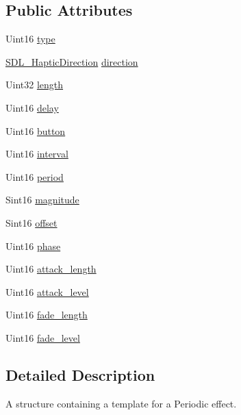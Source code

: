 \subsection*{Public Attributes}
\begin{DoxyCompactItemize}
\item 
Uint16 \hyperlink{structSDL__HapticPeriodic_ac53c5725e8cff012e9b90e01b7110869}{type}
\item 
\hyperlink{structSDL__HapticDirection}{S\+D\+L\+\_\+\+Haptic\+Direction} \hyperlink{structSDL__HapticPeriodic_a2c4f27d4583187a7a994e79ad49083d3}{direction}
\item 
Uint32 \hyperlink{structSDL__HapticPeriodic_a0ef0b17c54aaa5c99886c2a618444026}{length}
\item 
Uint16 \hyperlink{structSDL__HapticPeriodic_a8688d1c7ee6270ed290f6b474aef5ec9}{delay}
\item 
Uint16 \hyperlink{structSDL__HapticPeriodic_a9e0177354f4a285b8c98e4a31cd31752}{button}
\item 
Uint16 \hyperlink{structSDL__HapticPeriodic_a076d266e917098d89b2385b631629162}{interval}
\item 
Uint16 \hyperlink{structSDL__HapticPeriodic_a0e7e105b96308129b248d52b56a2a839}{period}
\item 
Sint16 \hyperlink{structSDL__HapticPeriodic_aad0ad2b00c7e6959da627663d91f7b94}{magnitude}
\item 
Sint16 \hyperlink{structSDL__HapticPeriodic_abc7aa9e9c0d546cb54189a7812fbe554}{offset}
\item 
Uint16 \hyperlink{structSDL__HapticPeriodic_a25e8c6aebc78bd74b9343fa228d25d8f}{phase}
\item 
Uint16 \hyperlink{structSDL__HapticPeriodic_ab35eedce7107edc75640586159fe75bb}{attack\+\_\+length}
\item 
Uint16 \hyperlink{structSDL__HapticPeriodic_a79fc2217fea6db6ab3d89ad905d52ccb}{attack\+\_\+level}
\item 
Uint16 \hyperlink{structSDL__HapticPeriodic_ae1c186d02304eae142a62dca72f50fa8}{fade\+\_\+length}
\item 
Uint16 \hyperlink{structSDL__HapticPeriodic_afa7713fc264959873f2a852fca4174fd}{fade\+\_\+level}
\end{DoxyCompactItemize}


\subsection{Detailed Description}
A structure containing a template for a Periodic effect. 

